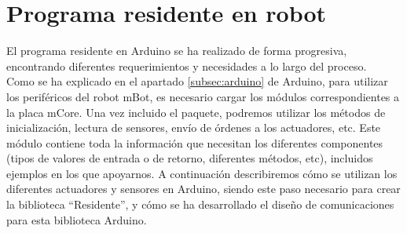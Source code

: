 \section{Programa residente en robot}\label{sec:residente}
El programa residente en Arduino se ha realizado de forma progresiva, encontrando diferentes requerimientos y necesidades a lo largo del proceso. \\

Como se ha explicado en el apartado \ref{subsec:arduino} de Arduino, para utilizar los periféricos del robot mBot, es necesario cargar los módulos correspondientes a la placa mCore. Una vez incluido el paquete, podremos utilizar los métodos de inicialización, lectura de sensores, envío de órdenes a los actuadores, etc. Este módulo contiene toda la información que necesitan los diferentes componentes (tipos de valores de entrada o de retorno, diferentes métodos, etc), incluidos ejemplos en los que apoyarnos. A continuación describiremos cómo se utilizan los diferentes actuadores y sensores en Arduino, siendo este paso necesario para crear la biblioteca ``Residente'', y cómo se ha desarrollado el diseño de comunicaciones para esta biblioteca Arduino.

